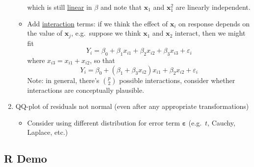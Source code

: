 \begin{enumerate}[label=(\arabic*)]
\begin{itemize}
                        which is still \underline{linear} in $ \beta $ and note that
                        $ \symbf{x}_1 $ and $ \symbf{x}_1^2 $ are linearly independent.
                  \item Add \underline{interaction} terms: if we think the effect
                        of $ \symbf{x}_i $ on response depends on the value of
                        $ \symbf{x}_j $, e.g.\ suppose we think $ \symbf{x}_1 $
                        and $ \symbf{x}_2 $ interact, then we might fit
                        \[ Y_i=\beta_0+\beta_1x_{i1}+\beta_2x_{i2}+\beta_3x_{i3}+\varepsilon_i \]
                        where $ x_{i3}=x_{i1}+x_{i2} $, so that
                        \[ Y_i=\beta_0+(\beta_1+\beta_3x_{i2})x_{i1}+\beta_2x_{i2}+\varepsilon_i \]
                        Note: in general, there's $ \binom{p}{2} $ possible interactions,
                        consider whether interactions are conceptually plausible.
            \end{itemize}
      \item QQ-plot of residuals not normal (even after any appropriate
            transformations)
            \begin{itemize}
                  \item Consider using different distribution for error
                        term $ \symbf{\varepsilon} $ (e.g.\ $ t $,
                        Cauchy, Laplace, etc.)
            \end{itemize}
\end{enumerate}
\subsection{R Demo}

